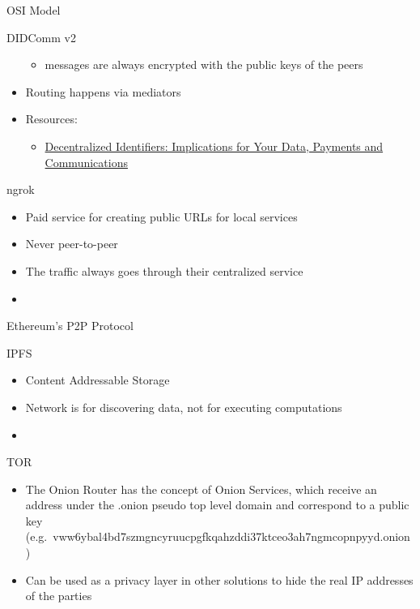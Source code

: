\begin{frame}[fragile]{OSI Model}
\begin{block}{DIDComm v2}
\begin{itemize}
  \begin{itemize}
  \tightlist
  \item
    messages are always encrypted with the public keys of the peers
  \end{itemize}
\item
  Routing happens via mediators
\item
  Resources:

  \begin{itemize}
  \tightlist
  \item
    \href{https://newsletter.impervious.ai/decentralized-identifiers-implications-for-your-data-payments-and-communications-2/}{Decentralized
    Identifiers: Implications for Your Data, Payments and
    Communications}
  \end{itemize}
\end{itemize}
\end{block}

\begin{block}{ngrok}
\protect\hypertarget{ngrok}{}
\begin{itemize}
\tightlist
\item
  Paid service for creating public URLs for local services
\item
  Never peer-to-peer
\item
  The traffic always goes through their centralized service
\item
\end{itemize}
\end{block}

\begin{block}{Ethereum's P2P Protocol}
\protect\hypertarget{ethereums-p2p-protocol}{}
\end{block}

\begin{block}{IPFS}
\protect\hypertarget{ipfs}{}
\begin{itemize}
\tightlist
\item
  Content Addressable Storage
\item
  Network is for discovering data, not for executing computations
\item
\end{itemize}
\end{block}

\begin{block}{TOR}
\protect\hypertarget{tor}{}
\begin{itemize}
\tightlist
\item
  The Onion Router has the concept of Onion Services, which receive an
  address under the .onion pseudo top level domain and correspond to a
  public key
  (e.g.~vww6ybal4bd7szmgncyruucpgfkqahzddi37ktceo3ah7ngmcopnpyyd.onion)
\item
  Can be used as a privacy layer in other solutions to hide the real IP
  addresses of the parties
\end{itemize}
\end{block}


\end{frame}
